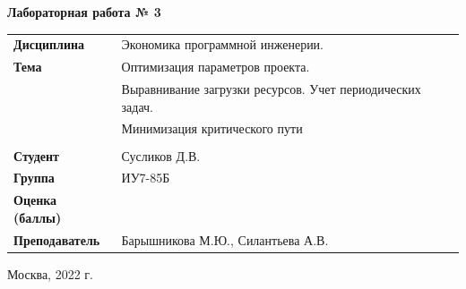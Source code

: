 \documentclass[a4paper,14pt]{extreport} %
\begin{document}
\begin{titlepage}
    \vspace{2cm}

    \begin{center}
        \textbf{Лабораторная работа № 3} \\
        \vspace{0.5cm}
    \end{center}

    \vspace{4cm}

    \begin{flushleft}
        \begin{tabular}{ll}
            \textbf{Дисциплина} & Экономика программной инженерии.  \\
            \textbf{Тема} & Оптимизация параметров проекта. \\
            & Выравнивание загрузки ресурсов. Учет периодических задач. \\
            & Минимизация критического пути \\
            \\
            \textbf{Студент} & Сусликов Д.В. \\
            \textbf{Группа} & ИУ7-85Б \\
            \textbf{Оценка (баллы)} & \\
            \textbf{Преподаватель} & Барышникова М.Ю., Силантьева А.В.   \\
        \end{tabular}
    \end{flushleft}

    \vspace{4cm}

   \begin{center}
        Москва, 2022 г.
    \end{center}

\end{titlepage}
\end{document}
